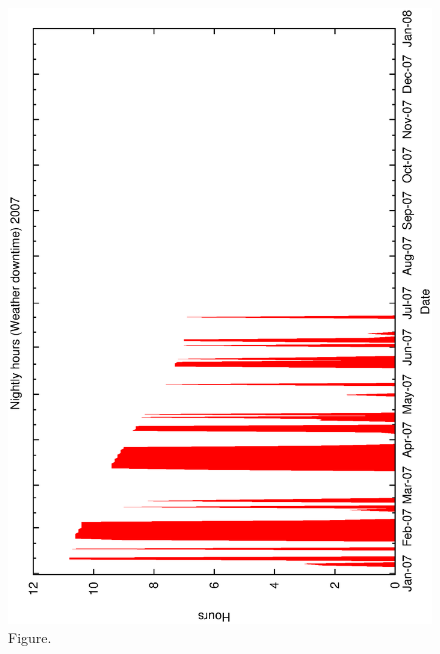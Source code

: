 \documentclass[12pt,a4paper]{article}
\begin{document}
\begin{figure}[htbp]
 \begin{center}
  \includegraphics[scale=1.0, angle=0]{figures/met_nightly_stats_weather2007.eps}
 \end{center}
  \caption[Figure.]
{Figure.}
\end{figure}
\clearpage
\end{document}
